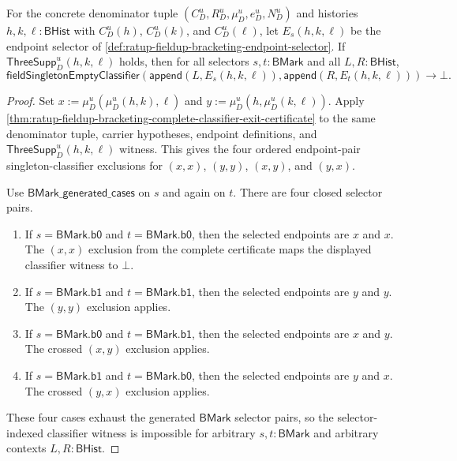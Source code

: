 \begin{theorem}
\label{thm:ratup-fieldup-bracketing-choice-classifier-exclusion}
For the concrete denominator tuple $(C_D^u,R_D^u,\mu_D^u,e_D^u,N_D^u)$ and
histories $h,k,\ell:\mathsf{BHist}$ with $C_D^u(h)$, $C_D^u(k)$, and
$C_D^u(\ell)$, let $E_s(h,k,\ell)$ be the endpoint selector of
\autoref{def:ratup-fieldup-bracketing-endpoint-selector}. If
$\mathsf{ThreeSupp}_D^u(h,k,\ell)$ holds, then for all selectors
$s,t:\mathsf{BMark}$ and all $L,R:\mathsf{BHist}$,
$$
\mathsf{fieldSingletonEmptyClassifier}
(\mathsf{append}(L,E_s(h,k,\ell)),\mathsf{append}(R,E_t(h,k,\ell)))\to\bot.
$$
\end{theorem}
\begin{proof}
Set $x:=\mu_D^u(\mu_D^u(h,k),\ell)$ and
$y:=\mu_D^u(h,\mu_D^u(k,\ell))$. Apply
\autoref{thm:ratup-fieldup-bracketing-complete-classifier-exit-certificate}
to the same denominator tuple, carrier hypotheses, endpoint definitions, and
$\mathsf{ThreeSupp}_D^u(h,k,\ell)$ witness. This gives the four ordered
endpoint-pair singleton-classifier exclusions for $(x,x)$, $(y,y)$, $(x,y)$,
and $(y,x)$.

Use $\mathsf{BMark\_generated\_cases}$ on $s$ and again on $t$. There are four
closed selector pairs.

\begin{enumerate}
  \item If $s=\mathsf{BMark.b0}$ and $t=\mathsf{BMark.b0}$, then the selected
  endpoints are $x$ and $x$. The $(x,x)$ exclusion from the complete
  certificate maps the displayed classifier witness to $\bot$.

  \item If $s=\mathsf{BMark.b1}$ and $t=\mathsf{BMark.b1}$, then the selected
  endpoints are $y$ and $y$. The $(y,y)$ exclusion applies.

  \item If $s=\mathsf{BMark.b0}$ and $t=\mathsf{BMark.b1}$, then the selected
  endpoints are $x$ and $y$. The crossed $(x,y)$ exclusion applies.

  \item If $s=\mathsf{BMark.b1}$ and $t=\mathsf{BMark.b0}$, then the selected
  endpoints are $y$ and $x$. The crossed $(y,x)$ exclusion applies.
\end{enumerate}

These four cases exhaust the generated $\mathsf{BMark}$ selector pairs, so the
selector-indexed classifier witness is impossible for arbitrary
$s,t:\mathsf{BMark}$ and arbitrary contexts $L,R:\mathsf{BHist}$.
\end{proof}

